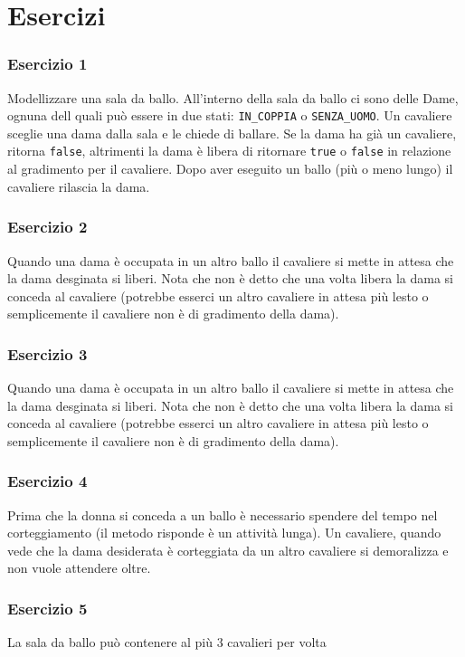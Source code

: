 \documentclass{beamer}
\begin{document}
\section{Esercizi}
\begin{frame}
\frametitle{Esercizio 1}
Modellizzare una sala da ballo. All'interno della sala da ballo ci sono delle Dame, ognuna dell quali pu\`o essere in due stati: \texttt{IN\_COPPIA} o \texttt{SENZA\_UOMO}. Un cavaliere sceglie una dama dalla sala e le chiede di ballare. Se la dama ha gi\`a un cavaliere, ritorna \texttt{false}, altrimenti la dama \`e libera di ritornare \texttt{true} o \texttt{false} in relazione al gradimento per il cavaliere. Dopo aver eseguito un ballo (pi\`u o meno lungo) il cavaliere rilascia la dama.
\end{frame}
\begin{frame}
\frametitle{Esercizio 2}
Quando una dama \`e occupata in un altro ballo il cavaliere si mette in attesa che la dama desginata si liberi. Nota che non \`e detto che una volta libera la dama si conceda al cavaliere (potrebbe esserci un altro cavaliere in attesa pi\`u lesto o semplicemente il cavaliere non \`e di gradimento della dama).
\end{frame}

\begin{frame}
\frametitle{Esercizio 3}
Quando una dama \`e occupata in un altro ballo il cavaliere si mette in attesa che la dama desginata si liberi. Nota che non \`e detto che una volta libera la dama si conceda al cavaliere (potrebbe esserci un altro cavaliere in attesa pi\`u lesto o semplicemente il cavaliere non \`e di gradimento della dama).
\end{frame}

\begin{frame}
\frametitle{Esercizio 4}
Prima che la donna si conceda a un ballo \`e necessario spendere del tempo nel corteggiamento (il metodo risponde \`e un attivit\`a lunga). Un cavaliere, quando vede che la dama desiderata \`e corteggiata da un altro cavaliere si demoralizza e non vuole attendere oltre. 
\end{frame}

\begin{frame}
\frametitle{Esercizio 5}
La sala da ballo pu\`o contenere al pi\`u 3 cavalieri per volta 
\end{frame}


\end{document}
